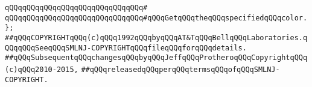 \verb|qQQqqQQqqQQqqQQqqQQqqQQqqQQqqQQq#|\newline
\verb|qQQqqQQqqQQqqQQqqQQqqQQqqQQqqQQq#qQQqGetqQQqtheqQQqspecifiedqQQqcolor.|\newline
\newline
\newline
\newline
\verb|};|\newline
\newline
\newline
\newline
\verb|##qQQqCOPYRIGHTqQQq(c)qQQq1992qQQqbyqQQqAT&TqQQqBellqQQqLaboratories.qQQqqQQqSeeqQQqSMLNJ-COPYRIGHTqQQqfileqQQqforqQQqdetails.|\newline
\verb|##qQQqSubsequentqQQqchangesqQQqbyqQQqJeffqQQqProtheroqQQqCopyrightqQQq(c)qQQq2010-2015,|\newline
\verb|##qQQqreleasedqQQqperqQQqtermsqQQqofqQQqSMLNJ-COPYRIGHT.|\newline

